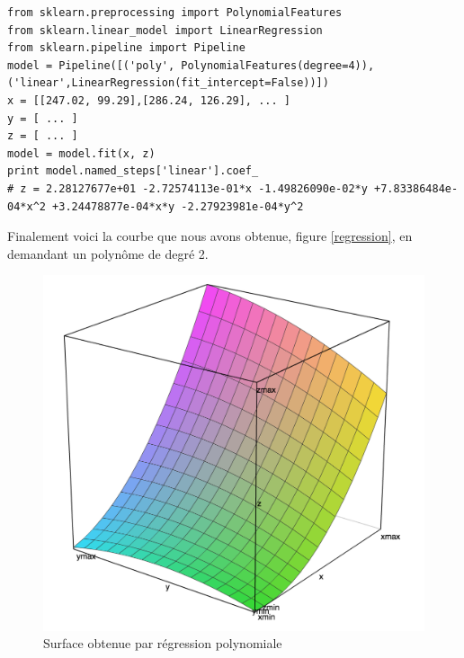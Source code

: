 \documentclass[titlepage,11pt,a4paper]{article}
\begin{document}
\begin{lstlisting}
from sklearn.preprocessing import PolynomialFeatures
from sklearn.linear_model import LinearRegression
from sklearn.pipeline import Pipeline
model = Pipeline([('poly', PolynomialFeatures(degree=4)), ('linear',LinearRegression(fit_intercept=False))])
x = [[247.02, 99.29],[286.24, 126.29], ... ]
y = [ ... ]
z = [ ... ]
model = model.fit(x, z)
print model.named_steps['linear'].coef_
# z = 2.28127677e+01 -2.72574113e-01*x -1.49826090e-02*y +7.83386484e-04*x^2 +3.24478877e-04*x*y -2.27923981e-04*y^2
\end{lstlisting}

Finalement voici la courbe que nous avons obtenue, figure \vref{regression}, en demandant un polynôme de degré 2.

\begin{figure}[!h]
	\centering
	\caption{\label{regression} Surface obtenue par régression polynomiale}
	
	\includegraphics[scale=0.5]{images/surface-regression.png}
	
\end{figure}
\end{document}
